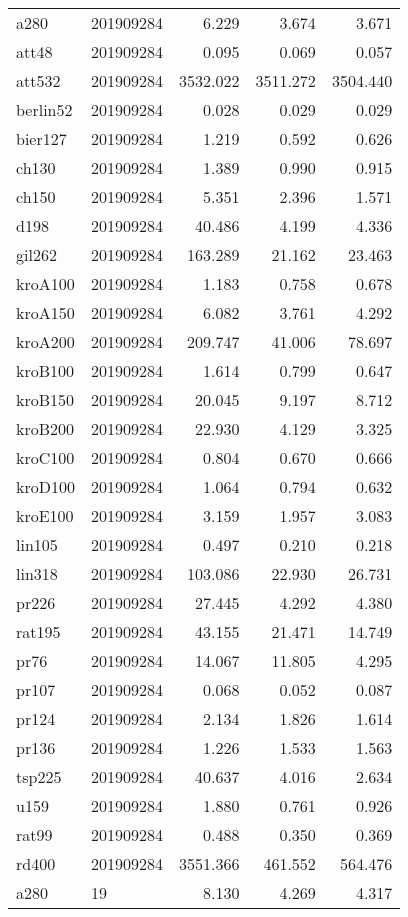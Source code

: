\begin{center}
\begin{longtable}{llrrr}
a280 & 201909284 & 6.229 & 3.674 & 3.671\\
att48 & 201909284 & 0.095 & 0.069 & 0.057\\
att532 & 201909284 & 3532.022 & 3511.272 & 3504.440\\
berlin52 &201909284 & 0.028 & 0.029 & 0.029\\
bier127 &201909284 & 1.219 & 0.592 & 0.626\\
ch130 &201909284 & 1.389 & 0.990 & 0.915\\
ch150 &201909284 & 5.351 & 2.396 & 1.571\\
d198 &201909284 & 40.486 & 4.199 & 4.336\\
gil262 &201909284 & 163.289 & 21.162 & 23.463\\
kroA100 &201909284 & 1.183 & 0.758 & 0.678\\
kroA150 &201909284 & 6.082 & 3.761 & 4.292\\
kroA200 &201909284 & 209.747 & 41.006 & 78.697\\
kroB100 &201909284 & 1.614 & 0.799 & 0.647\\
kroB150 &201909284 & 20.045 & 9.197 & 8.712\\
kroB200 &201909284 & 22.930 & 4.129 & 3.325\\
kroC100 &201909284 & 0.804 & 0.670 & 0.666\\
kroD100 &201909284 & 1.064 & 0.794 & 0.632\\
kroE100 &201909284 & 3.159 & 1.957 & 3.083\\
lin105 &201909284 & 0.497 & 0.210 & 0.218\\
lin318 &201909284 & 103.086 & 22.930 & 26.731\\
pr226 &201909284 & 27.445 & 4.292 & 4.380\\
rat195 &201909284 & 43.155 & 21.471 & 14.749\\
pr76 &201909284 & 14.067 & 11.805 & 4.295\\
pr107 &201909284 & 0.068 & 0.052 & 0.087\\
pr124 &201909284 & 2.134 & 1.826 & 1.614\\
pr136 &201909284 & 1.226 & 1.533 & 1.563\\
tsp225 &201909284 & 40.637 & 4.016 & 2.634\\
u159  &201909284 & 1.880 & 0.761 & 0.926\\
rat99 &201909284 & 0.488 & 0.350 & 0.369\\
rd400 &201909284 & 3551.366 & 461.552 & 564.476\\
a280 & 19 & 8.130 & 4.269 & 4.317\\

\end{longtable}
\end{center}
